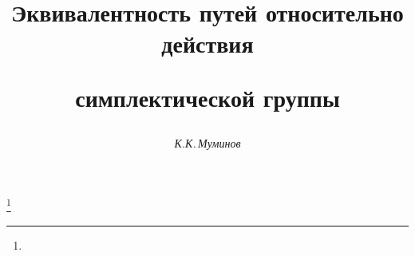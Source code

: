 






\newcommand{\la}{\langle}


\newcommand{\ra}{\rangle}


\newcommand{\SP}{\operatorname{Sp}}


\newcommand{\up}[2]{\overset{#1}{#2}{}}


\newcommand{\tts}[1]{}







\setcounter{page}{27}















\author{\it К.К.\,Муминов}




\title{Эквивалентность путей относительно действия


симплектической группы}


\thanks{}





\date{}




\pagestyle{plain} %







\maketitle


